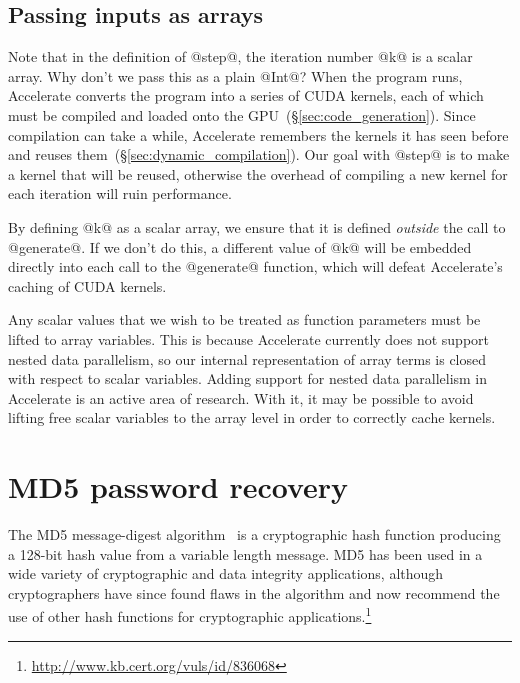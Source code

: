 \subsection{Passing inputs as arrays}

Note that in the definition of @step@, the iteration number @k@ is a scalar
array. Why don't we pass this as a plain @Int@? When the program runs,
Accelerate converts the program into a series of CUDA kernels, each of which
must be compiled and loaded onto the GPU~(\S\ref{sec:code_generation}). Since
compilation can take a while, Accelerate remembers the kernels it has seen
before and reuses them~(\S\ref{sec:dynamic_compilation}). Our goal with @step@
is to make a kernel that will be reused, otherwise the overhead of compiling a
new kernel for each iteration will ruin performance.

By defining @k@ as a scalar array, we ensure that it is defined \emph{outside}
the call to @generate@. If we don't do this, a different value of @k@ will be
embedded directly into each call to the @generate@ function, which will defeat
Accelerate's caching of CUDA kernels.

Any scalar values that we wish to be treated as function parameters must be
lifted to array variables. This is because Accelerate currently does not support
nested data parallelism, so our internal representation of array terms is closed
with respect to scalar variables.
Adding support for nested data parallelism in Accelerate is an active area of
research. With it, it may be possible to avoid lifting free scalar variables to
the array level in order to correctly cache kernels.


\section{MD5 password recovery}

The MD5 message-digest algorithm~\cite{Rivest:1992va} is a cryptographic hash
function producing a 128-bit hash value from a variable length message. MD5 has
been used in a wide variety of cryptographic and data integrity applications,
although cryptographers have since found flaws in the algorithm and now
recommend the use of other hash functions for cryptographic
applications.\footnote{\url{http://www.kb.cert.org/vuls/id/836068}}


